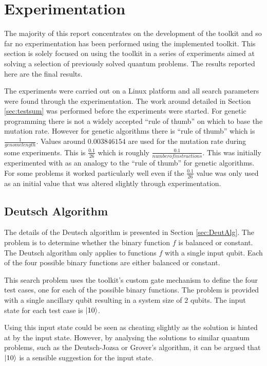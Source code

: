 \chapter{Experimentation}
\label{sec:experimentation}

The majority of this report concentrates on the development of the toolkit and so far no experimentation has been performed using the implemented toolkit.
This section is solely focused on using the toolkit in a series of experiments aimed at solving a selection of previously solved quantum problems.
The results reported here are the final results.

The experiments were carried out on a Linux platform and all search parameters were found through the experimentation.
The work around detailed in Section \ref{sec:testsum} was performed before the experiments were started.
For genetic programming there is not a widely accepted ``rule of thumb'' on which to base the mutation rate.
However for genetic algorithms there is ``rule of thumb'' which is $\frac{1}{genome length}$\cite{Ochoa}.
Values around $0.003846154$ are used for the mutation rate during some experiments.
This is $\frac{0.1}{26}$ which is roughly $\frac{0.1}{number of instructions}$.
This was initially experimented with as an analogy to the ``rule of thumb'' for genetic algorithms.
For some problems it worked particularly well even if the $\frac{0.1}{26}$ value was only used as an initial value that was altered slightly through experimentation.

\section{Deutsch Algorithm}
\label{sec:deutschexperiment}
The details of the Deutsch algorithm is presented in Section \ref{sec:DeutAlg}.
The problem is to determine whether the binary function $f$ is balanced or constant.
The Deutsch algorithm only applies to functions $f$ with a single input qubit.
Each of the four possible binary functions are either balanced or constant.

This search problem uses the toolkit's custom gate mechanism to define the four test cases, one for each of the possible binary functions.
The problem is provided with a single ancillary qubit resulting in a system size of $2$ qubits.
The input state for each test case is $\left\vert{10}\right\rangle$.

Using this input state could be seen as cheating slightly as the solution is hinted at by the input state.
However, by analysing the solutions to similar quantum problems, such as the Deutsch-Jozsa or Grover's algorithm, it can be argued that $\left\vert{10}\right\rangle$ is a sensible suggestion for the input state.

